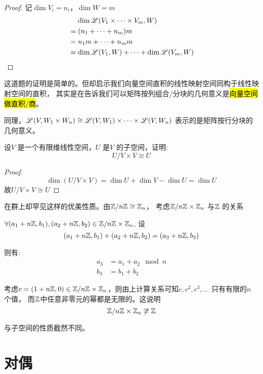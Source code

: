 \begin{proof}
    记\(\dim V_{i}=n_{i}\)，\(\dim W=m\)
    \begin{align*}
        &\mathrel{\phantom{=}}\dim \mathscr{L}(V_{1} \times
        \dots \times V_{m}, W) \\
        &= (n_1+\dots+n_{m})m \\
        &= n_{1}m + \dots + n_{m}m \\
        &= \dim \mathscr{L}(V_{1},W) + \dots +
        \dim \mathscr{L}(V_{m},W)\\
    \end{align*}
\end{proof}
这道题的证明是简单的。但却启示我们向量空间直积的线性映射空间同构于线性映射空间的直积，
其实是在告诉我们可以矩阵按列组合/分块的几何意义是\hl{向量空间做直积/商}。

同理，\(\mathscr{L}(V,W_1\times W_{n})\cong
    \mathscr{L}(V,W_1)\times \dots \times
\mathscr{L}(V,W_{n})\) 表示的是矩阵按行分块的几何意义。

\begin{problem}
    设\(V\) 是一个有限维线性空间，\(U\) 是\(V\) 的子空间，证明:
    \[
        U/V \times V \cong U
    \]
\end{problem}

\begin{proof}
    \[
        \dim (U/V \times V) = \dim U + \dim V - \dim U = \dim U
    \]
    故\(U/V \times V \cong U\)
\end{proof}

在群上却罕见这样的优美性质。由\(\mathbb{Z}/n\mathbb{Z} \cong
\mathbb{Z}_{n}\)，
考虑\(\mathbb{Z}/n\mathbb{Z}\times\mathbb{Z}_{n}\) 与\(\mathbb{Z}\) 的关系

\(\forall (a_1+n\mathbb{Z}, b_1),(a_2+n\mathbb{Z}, b_2) \in
\mathbb{Z}/n\mathbb{Z} \times \mathbb{Z}_{n}\), 设\[
    (a_1+n\mathbb{Z}, b_1)+(a_2+n\mathbb{Z}, b_2) =
    (a_3+n\mathbb{Z}, b_3)
\]

则有:
\begin{align*}
    a_3 &= a_1 + a_2 \mod n \\
    b_3 &= b_1 + b_2
\end{align*}

考虑\(c=(1+n\mathbb{Z},0) \in \mathbb{Z}/n\mathbb{Z} \times
\mathbb{Z}_{n}\)，则由上计算关系可知\(c, c^{2}, c^{3}, \dots \) 只有有限的\(n\) 个值，
而\(\mathbb{Z}\)中任意非零元的幂都是无限的。这说明
\[
    \mathbb{Z}/n\mathbb{Z} \times \mathbb{Z}_{n} \not\cong \mathbb{Z}
\]

与子空间的性质截然不同。

\section{对偶}

